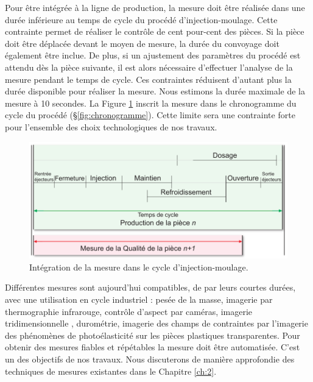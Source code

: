 Pour être intégrée à la ligne de production, la mesure doit être réalisée dans une durée inférieure au temps de cycle du procédé d'injection-moulage.
Cette contrainte permet de réaliser le contrôle de cent pour-cent des pièces.
Si la pièce doit être déplacée devant le moyen de mesure, la durée du convoyage doit également être inclue.
De plus, si un ajustement des paramètres du procédé est attendu dès la pièce suivante, il est alors nécessaire d'effectuer l'analyse de la mesure pendant le temps de cycle.
Ces contraintes réduisent d'autant plus la durée disponible pour réaliser la mesure.
Nous estimons la durée maximale de la mesure à 10 secondes.
La Figure \ref{fig:time_constraint} inscrit la mesure dans le chronogramme du cycle du procédé (§\ref{fig:chronogramme}).
Cette limite sera une contrainte forte pour l'ensemble des choix technologiques de nos travaux.

\begin{figure}[hbtp]
	\centering
	\includegraphics[width=\textwidth,height=\textheight,keepaspectratio]{../Chap1/Figures/SAPRISTI_Chronogramme-Simple.pdf}
	\caption{Intégration de la mesure dans le cycle d'injection-moulage.}
	\label{fig:time_constraint}
\end{figure}

Différentes mesures sont aujourd'hui compatibles, de par leurs courtes durées, avec une utilisation en cycle industriel : pesée de la masse, imagerie par thermographie infrarouge, contrôle d'aspect par caméras, imagerie tridimensionnelle \cite{schwenke_optical_2002}, durométrie, imagerie des champs de contraintes par l'imagerie des phénomènes de photoélasticité sur les pièces plastiques transparentes.
Pour obtenir des mesures fiables et répétables la mesure doit être automatisée.
C'est un des objectifs de nos travaux.
Nous discuterons de manière approfondie des techniques de mesures existantes dans le Chapitre \ref{ch:2}.

